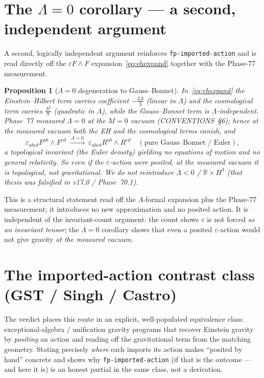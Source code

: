\documentclass[11pt]{article}
\newcommand{\R}{\mathbb{R}}
\theoremstyle{definition}\newtheorem{remark}{Remark}
\theoremstyle{definition}\newtheorem{definition}{Definition}
\theoremstyle{plain}\newtheorem{proposition}{Proposition}
\theoremstyle{plain}\newtheorem{lemma}{Lemma}
\begin{document}
\section{The $\Lambda=0$ corollary --- a second, independent argument}
A second, logically independent argument reinforces \texttt{fp-imported-action} and is
read directly off the $\varepsilon F\wedge F$ expansion~\eqref{eq:ehexpand} together
with the Phase-77 measurement.

\begin{proposition}[$\Lambda=0$ degeneration to Gauss--Bonnet]\label{prop:lambda0}
In~\eqref{eq:ehexpand} the Einstein--Hilbert term carries coefficient
$-\tfrac{2\Lambda}{3}$ (linear in $\Lambda$) and the cosmological term carries
$\tfrac{\Lambda^2}{9}$ (quadratic in $\Lambda$), while the Gauss--Bonnet term is
$\Lambda$-independent. Phase~77 \emph{measured} $\Lambda=0$ at the $M=0$ vacuum
(CONVENTIONS~\S6); hence at the measured vacuum both the EH and the cosmological terms
\emph{vanish}, and
\begin{equation}
  \varepsilon_{abcd}F^{ab}\wedge F^{cd}\ \xrightarrow{\ \Lambda=0\ }\
  \varepsilon_{abcd}R^{ab}\wedge R^{cd}\quad(\text{pure Gauss--Bonnet / Euler}),
\end{equation}
a \emph{topological} invariant (the Euler density) yielding no equations of motion and
no general relativity. So even if the $\varepsilon$-action were posited, at the measured
vacuum it is topological, not gravitational. We do \emph{not} reintroduce $\Lambda<0$ /
$\R\times H^3$ (that thesis was falsified in v17.0 / Phase~70.1).
\end{proposition}

This is a structural statement read off the $\Lambda$-formal expansion plus the
Phase-77 measurement; it introduces no new approximation and no posited action. It is
independent of the invariant-count argument: the count shows $\varepsilon$ is not forced
\emph{as an invariant tensor}; the $\Lambda=0$ corollary shows that even a posited
$\varepsilon$-action would not give gravity \emph{at the measured vacuum}.

\section{The imported-action contrast class (GST / Singh / Castro)}
The verdict places this route in an explicit, well-populated equivalence class:
exceptional-algebra / unification gravity programs that recover Einstein gravity by
\emph{positing} an action and reading off the gravitational term from the matching
geometry. Stating precisely \emph{where} each imports its action makes ``posited by
hand'' concrete and shows why \texttt{fp-imported-action} (if that is the outcome ---
and here it is) is an honest partial in the same class, not a derivation.
\end{document}
